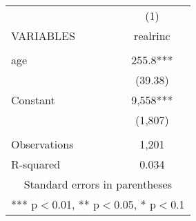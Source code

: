 \begin{tabular}{lc} \hline
 & (1) \\
VARIABLES & realrinc \\ \hline
 &  \\
age & 255.8*** \\
 & (39.38) \\
Constant & 9,558*** \\
 & (1,807) \\
 &  \\
Observations & 1,201 \\
 R-squared & 0.034 \\ \hline
\multicolumn{2}{c}{ Standard errors in parentheses} \\
\multicolumn{2}{c}{ *** p$<$0.01, ** p$<$0.05, * p$<$0.1} \\
\end{tabular}
